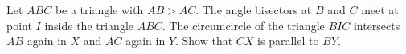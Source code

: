 Let $ABC$ be a triangle with $AB>AC$.
The angle bisectors at $B$ and $C$ meet at point $I$ inside the triangle $ABC$.
The circumcircle of the triangle $BIC$ intersects $AB$ again in $X$ and $AC$ again in $Y$.
Show that $CX$ is parallel to $BY$.
